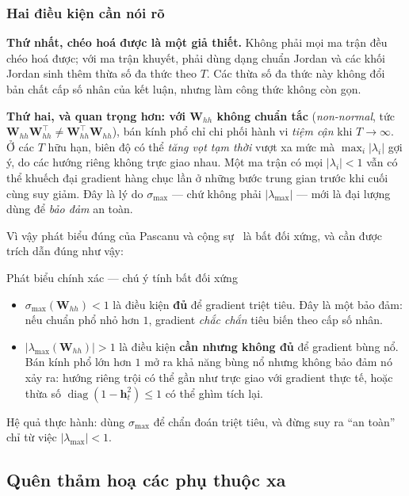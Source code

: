 \subsubsection{Hai điều kiện cần nói rõ}

\textbf{Thứ nhất, chéo hoá được là một giả thiết.} Không phải mọi ma trận đều
chéo hoá được; với ma trận khuyết, phải dùng dạng chuẩn Jordan và các khối Jordan
sinh thêm thừa số đa thức theo $T$. Các thừa số đa thức này không đổi bản chất
cấp số nhân của kết luận, nhưng làm công thức không còn gọn.

\textbf{Thứ hai, và quan trọng hơn: với $\mathbf{W}_{hh}$ không chuẩn tắc}
(\emph{non-normal}, tức $\mathbf{W}_{hh}\mathbf{W}_{hh}^{\top}\neq
\mathbf{W}_{hh}^{\top}\mathbf{W}_{hh}$), bán kính phổ chỉ chi phối hành vi
\emph{tiệm cận} khi $T\to\infty$. Ở các $T$ hữu hạn, biên độ có thể \emph{tăng
vọt tạm thời} vượt xa mức mà $\max_i|\lambda_i|$ gợi ý, do các hướng riêng không
trực giao nhau. Một ma trận có mọi $|\lambda_i| < 1$ vẫn có thể khuếch đại
gradient hàng chục lần ở những bước trung gian trước khi cuối cùng suy giảm. Đây
là lý do $\sigma_{\max}$ --- chứ không phải $|\lambda_{\max}|$ --- mới là đại
lượng dùng để \emph{bảo đảm} an toàn.

Vì vậy phát biểu đúng của Pascanu và cộng sự~\cite{Pascanu2013} là bất đối xứng,
và cần được trích dẫn đúng như vậy:

\begin{guidelinebox}{Phát biểu chính xác --- chú ý tính bất đối xứng}
\begin{itemize}[leftmargin=*, itemsep=2pt]
  \item $\sigma_{\max}(\mathbf{W}_{hh}) < 1$ là điều kiện \textbf{đủ} để gradient
    triệt tiêu. Đây là một bảo đảm: nếu chuẩn phổ nhỏ hơn $1$, gradient
    \emph{chắc chắn} tiêu biến theo cấp số nhân.
  \item $\left|\lambda_{\max}(\mathbf{W}_{hh})\right| > 1$ là điều kiện
    \textbf{cần nhưng không đủ} để gradient bùng nổ. Bán kính phổ lớn hơn $1$ mở
    ra khả năng bùng nổ nhưng không bảo đảm nó xảy ra: hướng riêng trội có thể
    gần như trực giao với gradient thực tế, hoặc thừa số
    $\operatorname{diag}(1-\mathbf{h}_t^2)\le1$ có thể ghìm tích lại.
\end{itemize}
Hệ quả thực hành: dùng $\sigma_{\max}$ để chẩn đoán triệt tiêu, và đừng suy ra
``an toàn'' chỉ từ việc $|\lambda_{\max}| < 1$.
\end{guidelinebox}

\subsection{Quên thảm hoạ các phụ thuộc xa}

